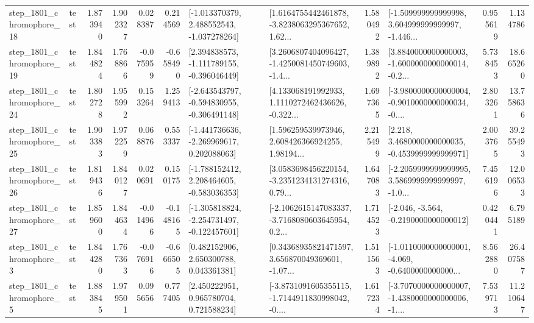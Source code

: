 \begin{tabular}{llrrrrllrlrr}
 step\_1801\_chromophore\_18 &      test &      1.873940 &    1.902327 &      0.028387 &  0.214569 &   [-1.013370379, 2.488552543, -1.037278264] &  [1.6164755442461878, -3.8238063295367652, 1.62... &       1.580492 &  [-1.509999999999998, 3.604999999999997, -1.446... &            0.955619 &          1.134786 \\
 step\_1801\_chromophore\_19 &      test &      1.844824 &    1.768866 &     -0.075959 & -0.658490 &   [2.394838573, -1.111789155, -0.396046449] &  [3.2606807404096427, -1.4250081450749603, -1.4... &       1.389892 &  [3.8840000000000003, -1.6000000000000014, -0.2... &            5.738453 &         18.665260 \\
 step\_1801\_chromophore\_24 &      test &      1.802728 &    1.955992 &      0.153264 &  1.259413 &  [-2.643543797, -0.594830955, -0.306491148] &  [4.133068191992933, 1.1110272462436626, -0.322... &       1.697365 &  [-3.9800000000000004, -0.9010000000000034, -0.... &            2.803261 &         13.758636 \\
 step\_1801\_chromophore\_25 &      test &      1.903383 &    1.972259 &      0.068876 &  0.553337 &   [-1.441736636, -2.269969617, 0.202088063] &  [1.596259539973946, 2.608426366924255, 1.98194... &       2.215499 &   [2.218, 3.4680000000000035, -0.4539999999999971] &            2.003765 &         39.255493 \\
 step\_1801\_chromophore\_26 &      test &      1.819436 &    1.840127 &      0.020691 &  0.150175 &   [-1.788152412, 2.208464605, -0.583036353] &  [3.0583698456220154, -3.2351234131274316, 0.79... &       1.647083 &  [-2.2059999999999995, 3.5869999999999997, -1.0... &            7.456196 &         12.006533 \\
 step\_1801\_chromophore\_27 &      test &      1.859600 &    1.844634 &     -0.014966 & -0.148165 &  [-1.305818824, -2.254731497, -0.122457601] &  [-2.1062615147083337, -3.7168080603645954, 0.2... &       1.714523 &              [-2.046, -3.564, -0.2190000000000012] &            0.420441 &          6.795189 \\
  step\_1801\_chromophore\_3 &      test &      1.844280 &    1.767363 &     -0.076916 & -0.666505 &     [0.482152906, 2.650300788, 0.043361381] &  [0.34368935821471597, 3.656870049369601, -1.07... &       1.511563 &  [-1.0110000000000001, -4.069, -0.6400000000000... &            8.562880 &         26.407587 \\
  step\_1801\_chromophore\_5 &      test &      1.883845 &    1.979501 &      0.095656 &  0.777405 &     [2.450222951, 0.965780704, 0.721588234] &  [-3.8731091605355115, -1.7144911830998042, -0.... &       1.617234 &  [-3.7070000000000007, -1.4380000000000006, -1.... &            7.539713 &         11.210647 \\

\end{tabular}
